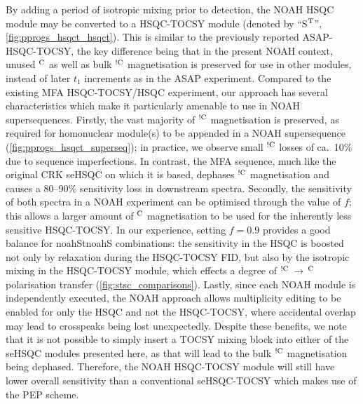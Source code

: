 \documentclass[11pt]{article}
\newcommand*{\noahtwo}[2]{\csname noah#1\endcsname\csname noah#2\endcsname}
\newcommand*{\noahSt}{S$\rm ^T$}
\newcommand*{\hl}[1]{\textcolor{WildStrawberry}{#1}}
\newcommand*{\magn}[1]{\ce{^1H}$^{#1}$}
\newcommand*{\magnnot}[1]{\ce{^1H}$^{!#1}$}
\begin{document}
By adding a period of isotropic mixing prior to detection, the NOAH HSQC module may be converted to a HSQC-TOCSY module (denoted by ``\noahSt{}'', \cref{fig:pprogs_hsqct_hsqct}).
This is similar to the previously reported ASAP-HSQC-TOCSY,\autocite{Becker2019JMR} the key difference being that in the present NOAH context, unused \magn{\ce{C}} as well as bulk \magnnot{\ce{C}} magnetisation is preserved for use in other modules, instead of later $t_1$ increments as in the ASAP experiment.
Compared to the existing MFA HSQC-TOCSY/HSQC experiment,\autocite{Nolis2019CPC} our approach has several characteristics which make it particularly amenable to use in NOAH supersequences.
Firstly, the vast majority of \magnnot{\ce{C}} magnetisation is preserved, as required for homonuclear module(s) to be appended in a NOAH supersequence (\cref{fig:pprogs_hsqct_superseq}); in practice, we observe small \magnnot{\ce{C}} losses of ca.\ 10\% due to sequence imperfections.
In contrast, the MFA sequence, much like the original CRK seHSQC on which it is based, dephases \magnnot{\ce{C}} magnetisation and causes a 80--90\% sensitivity loss in downstream spectra.
Secondly, the sensitivity of both spectra in a NOAH experiment can be optimised through the value of $f$; this allows a larger amount of \magn{\ce{C}} magnetisation to be used for the inherently less sensitive HSQC-TOCSY.
In our experience, setting $f = 0.9$ provides a good balance for \noahtwo{St}{S} combinations: the sensitivity in the HSQC is boosted not only by relaxation during the HSQC-TOCSY FID, but also by the isotropic mixing in the HSQC-TOCSY module, which effects a degree of \magnnot{\ce{C}}\,$\to\,$\magn{\ce{C}} \hl{polarisation} transfer (\cref{fig:stsc_comparisons}).
Lastly, since each NOAH module is independently executed, the NOAH approach allows multiplicity editing to be enabled for only the HSQC and not the HSQC-TOCSY, where accidental overlap may lead to crosspeaks being lost unexpectedly.
Despite these benefits, we note that it is not possible to simply insert a TOCSY mixing block into \hl{either of the} seHSQC modules presented here, as that will lead to the bulk \magnnot{\ce{C}} magnetisation being dephased.
Therefore, the NOAH HSQC-TOCSY module will still have lower overall sensitivity than a conventional seHSQC-TOCSY which makes use of the PEP scheme.

\end{document}
